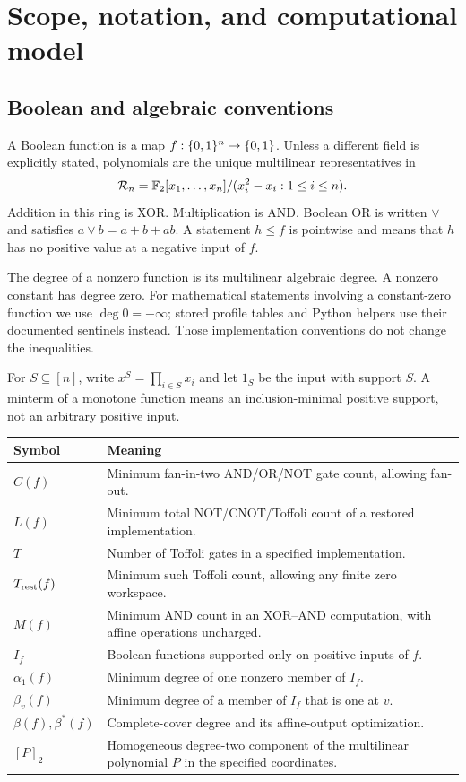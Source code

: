 \chapter{Scope, notation, and computational model}
\label{c:ch:foundations}
\section{Boolean and algebraic conventions}
A Boolean function is a map $f:\{0,1\}^n\to\{0,1\}$. Unless a different field is explicitly stated, polynomials are the unique multilinear representatives in
\[
\mathcal R_n=\mathbb F_2[x_1,\ldots,x_n]/(x_i^2-x_i:1\le i\le n).
\]
Addition in this ring is XOR. Multiplication is AND. Boolean OR is written $\lor$ and satisfies $a\lor b=a+b+ab$. A statement $h\le f$ is pointwise and means that $h$ has no positive value at a negative input of $f$.

The degree of a nonzero function is its multilinear algebraic degree. A nonzero constant has degree zero. For mathematical statements involving a constant-zero function we use $\deg0=-\infty$; stored profile tables and Python helpers use their documented sentinels instead. Those implementation conventions do not change the inequalities.

For $S\subseteq[n]$, write $x^S=\prod_{i\in S}x_i$ and let $1_S$ be the input with support $S$. A minterm of a monotone function means an inclusion-minimal positive support, not an arbitrary positive input.

\begin{longtable}{@{}>{\RaggedRight\arraybackslash}p{1.1in}>{\RaggedRight\arraybackslash}p{5.0in}@{}}
\toprule
\textbf{Symbol} & \textbf{Meaning}\\\midrule\endhead
$C(f)$ & Minimum fan-in-two AND/OR/NOT gate count, allowing fan-out.\\
$L(f)$ & Minimum total NOT/CNOT/Toffoli count of a restored implementation.\\
$T$ & Number of Toffoli gates in a specified implementation.\\
$T_{\mathrm{rest}}(f)$ & Minimum such Toffoli count, allowing any finite zero workspace.\\
$M(f)$ & Minimum AND count in an XOR--AND computation, with affine operations uncharged.\\
$I_f$ & Boolean functions supported only on positive inputs of $f$.\\
$\alpha_1(f)$ & Minimum degree of one nonzero member of $I_f$.\\
$\beta_v(f)$ & Minimum degree of a member of $I_f$ that is one at $v$.\\
$\beta(f),\beta^*(f)$ & Complete-cover degree and its affine-output optimization.\\
$[P]_2$ & Homogeneous degree-two component of the multilinear polynomial $P$ in the specified coordinates.\\
\bottomrule
\end{longtable}

